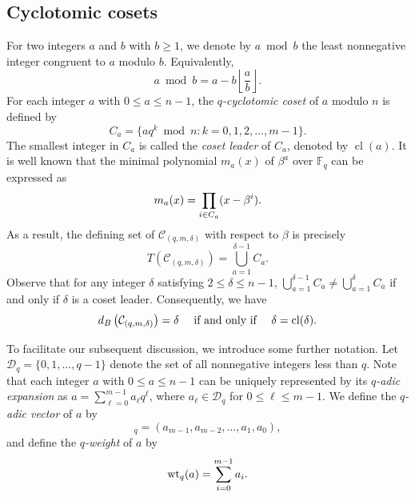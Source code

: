 \documentclass[journal,onecolumn]{IEEEtran}
\newcommand{\wtq}{\mathrm{wt}_q}
\newcommand{\cl}{\operatorname{cl}}
\begin{document}
\subsection{Cyclotomic cosets}
For two   integers $a$ and $b$ with $b\geq 1$,  we denote by  $a\bmod b$   the least nonnegative integer congruent to $a$ modulo $b$. Equivalently,
\begin{equation*}
    a\bmod b = a  - b  \left\lfloor \frac{a}{b} \right\rfloor.
\end{equation*}
For each integer $a$ with $0\leq a\leq n-1$, the \emph{$q$-cyclotomic coset} of $a$ modulo $n$ is defined by
\begin{equation*}
    C_a=\{aq^k\bmod n:k= 0,1,2,\ldots,m-1\}.
\end{equation*}
The smallest integer in $C_a$   is called the  \emph{coset leader} of $C_a$, denoted by $\cl(a)$. 
It is well known that 
   the minimal polynomial $m_a(x)$ of $\beta^a$ over $\mathbb{F}_q$ can be expressed as 
\begin{equation}\notag
    m_a(x)=\prod\limits_{i\in C_a}(x-\beta^i).
\end{equation} 
As a result, the defining set of 
$\mathcal{C}_{(q,m,\delta)}$ with respect to $\beta$ is precisely 
\begin{equation}\label{pre1}
  T(\mathcal{C}_{(q,m,\delta)}) = \bigcup_{a=1}^{\delta-1} C_a.
\end{equation}
Observe  that  for any  integer  $\delta$  satisfying $2\leq \delta\leq  n-1$, 
$
\bigcup\limits_{a=1}^{\delta-1}C_a \neq  \bigcup\limits_{a=1}^{\delta}C_a$
 if and only if 
$\delta$ is a coset leader.
  Consequently,   we have   
\begin{equation}\label{db}
d_B\left(\mathcal{C}_{(q,m,\delta)}\right)=\delta \quad \hbox{ if and only if } \quad \delta=\cl(\delta). 
\end{equation}

To facilitate our subsequent discussion, we introduce some further notation.
Let $\mathcal{D}_q=\{0,1,\ldots,q-1\}$  denote the set of all nonnegative integers less than $q$. 
 Note that 
each  integer $a$ with $0\leq a\leq n-1$ can be uniquely represented by its \textit{$q$-adic expansion} as  $a=\sum_{\ell=0}^{m-1}a_\ell q^\ell$, where  $a_\ell\in \mathcal{D}_q  
$ for $0\leq \ell\leq m-1$. We define the 
 \emph{$q$-adic vector} of $a$ by 
\begin{equation*}
    [a]_q=(a_{m-1},a_{m-2},\ldots,a_1,a_0),
\end{equation*}
and define the \textit{$q$-weight} of $a$ by 
\begin{equation}\notag
\wtq(a)=\sum_{i=0}^{m-1}a_i. 
\end{equation} 
\end{document}
